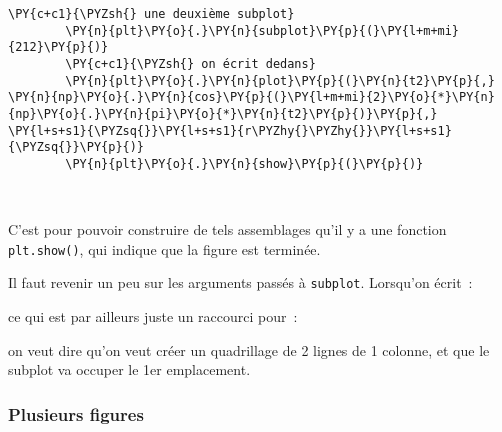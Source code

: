 \begin{Verbatim}[commandchars=\\\{\},frame=single,framerule=0.3mm,rulecolor=\color{cellframecolor}]
        \PY{c+c1}{\PYZsh{} une deuxième subplot}
        \PY{n}{plt}\PY{o}{.}\PY{n}{subplot}\PY{p}{(}\PY{l+m+mi}{212}\PY{p}{)}
        \PY{c+c1}{\PYZsh{} on écrit dedans}
        \PY{n}{plt}\PY{o}{.}\PY{n}{plot}\PY{p}{(}\PY{n}{t2}\PY{p}{,} \PY{n}{np}\PY{o}{.}\PY{n}{cos}\PY{p}{(}\PY{l+m+mi}{2}\PY{o}{*}\PY{n}{np}\PY{o}{.}\PY{n}{pi}\PY{o}{*}\PY{n}{t2}\PY{p}{)}\PY{p}{,} \PY{l+s+s1}{\PYZsq{}}\PY{l+s+s1}{r\PYZhy{}\PYZhy{}}\PY{l+s+s1}{\PYZsq{}}\PY{p}{)}
        \PY{n}{plt}\PY{o}{.}\PY{n}{show}\PY{p}{(}\PY{p}{)}
\end{Verbatim}


    \begin{center}
    \end{center}
    { \hspace*{\fill} \\}
    
    C'est pour pouvoir construire de tels assemblages qu'il y a une fonction
\texttt{plt.show()}, qui indique que la figure est terminée.

    Il faut revenir un peu sur les arguments passés à \texttt{subplot}.
Lorsqu'on écrit~:

\begin{Shaded}
\begin{Highlighting}[frame=lines,framerule=0.6mm,rulecolor=\color{asisframecolor}]
\NormalTok{)}
\end{Highlighting}
\end{Shaded}

ce qui est par ailleurs juste un raccourci pour~:

\begin{Shaded}
\begin{Highlighting}[frame=lines,framerule=0.6mm,rulecolor=\color{asisframecolor}]
\NormalTok{, }\NormalTok{, }\NormalTok{)}
\end{Highlighting}
\end{Shaded}

on veut dire qu'on veut créer un quadrillage de 2 lignes de 1 colonne,
et que le subplot va occuper le 1er emplacement.

    \hypertarget{plusieurs-figures}{%
\subsubsection{Plusieurs figures}\label{plusieurs-figures}}

